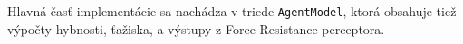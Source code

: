 Hlavná časť implementácie sa nachádza v triede \texttt{AgentModel}, ktorá obsahuje tiež výpočty hybnosti, ťažiska, a výstupy z Force Resistance perceptora.%




